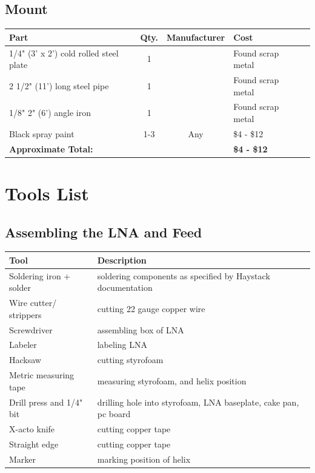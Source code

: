\documentclass[11pt]{article} %
\begin{document}
\subsection{Mount}

\begin{tabular}{| p{6cm} | c | c | l | c |}
\hline
\textbf{Part} & \textbf{Qty.} & \textbf{Manufacturer} & \textbf{Cost} \\ \hline \hline
1/4" (3' x 2') cold rolled steel plate & 1 & & Found scrap metal \\ \hline	
2 1/2" (11') long steel pipe & 1 & &  Found scrap metal \\ \hline
1/8" 2" (6') angle iron	 & 1 & &  Found scrap metal \\ \hline
Black spray paint & 1-3 & Any & \$4 - \$12 \\ \hline
\textbf{Approximate Total:} & & & \textbf{\$4 - \$12} \\ \hline
\end{tabular}


\newpage

\section{Tools List}

\subsection{Assembling the LNA and Feed}

\begin{tabular}{| l | p{10cm} |}
\hline
\textbf{Tool} & \textbf{Description} \\ \hline \hline
Soldering iron + solder & soldering components as specified by Haystack documentation \\ \hline
Wire cutter/ strippers & cutting 22 gauge copper wire\\ \hline
Screwdriver & assembling box of LNA\\ \hline
Labeler & labeling LNA\\ \hline
Hacksaw & cutting styrofoam\\ \hline
Metric measuring tape & measuring styrofoam, and helix position\\ \hline
Drill press and 1/4" bit & drilling hole into styrofoam, LNA baseplate, cake pan, pc board\\ \hline
X-acto knife & cutting copper tape\\ \hline
Straight edge & cutting copper tape\\ \hline
Marker & marking position of helix\\ \hline
\end{tabular}
\end{document}
